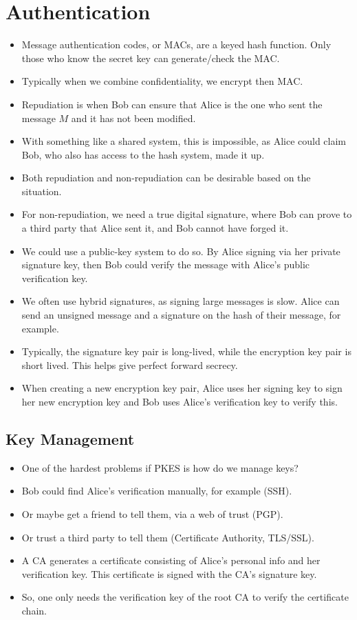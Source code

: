 \documentclass{article}
\begin{document}
\section{Authentication}
\begin{itemize}
    \item Message authentication codes, or MACs, are a keyed hash function.  Only those who know the secret key can generate/check the MAC.
    \item Typically when we combine confidentiality, we encrypt then MAC.
    \item Repudiation is when Bob can ensure that Alice is the one who sent the message $M$ and it has not been modified.
    \item With something like a shared system, this is impossible, as Alice could claim Bob, who also has access to the hash system, made it up.
    \item Both repudiation and non-repudiation can be desirable based on the situation.
    \item For non-repudiation, we need a true digital signature, where Bob can prove to a third party that Alice sent it, and Bob cannot have forged it.
    \item We could use a public-key system to do so.  By Alice signing via her private signature key, then Bob could verify the message with Alice's public verification key.
    \item We often use hybrid signatures, as signing large messages is slow.  Alice can send an unsigned message and a signature on the hash of their message, for example.
    \item Typically, the signature key pair is long-lived, while the encryption key pair is short lived.  This helps give perfect forward secrecy.
    \item When creating a new encryption key pair, Alice uses her signing key to sign her new encryption key and Bob uses Alice's verification key to verify this.
\end{itemize}

\subsection{Key Management}
\begin{itemize}
    \item One of the hardest problems if PKES is how do we manage keys?
    \item Bob could find Alice's verification manually, for example (SSH).
    \item Or maybe get a friend to tell them, via a web of trust (PGP).
    \item Or trust a third party to tell them (Certificate Authority, TLS/SSL).
    \item A CA generates a certificate consisting of Alice's personal info and her verification key.  This certificate is signed with the CA's signature key.
    \item So, one only needs the verification key of the root CA to verify the certificate chain.
\end{itemize}
\end{document}
